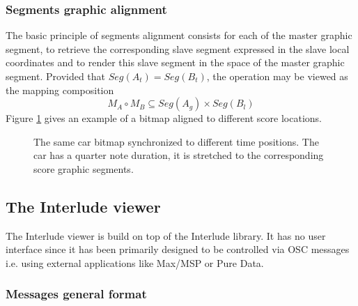 \documentclass[twoside,10pt]{article}
\newcommand{\seg}[1]			{Seg(#1)}
\begin{document}
\subsubsection{Segments graphic alignment}
The basic principle of segments alignment consists for each of the master graphic segment, to retrieve the corresponding slave segment expressed in the slave local coordinates and to render this slave segment in the space of the master graphic segment.
Provided that $\seg{A_t} = \seg{B_t}$, the operation may be viewed as the mapping composition 
\[
M_{A} \circ M_{B} \subseteq \seg{A_{g}}\times \seg{B_{l}}
\]
Figure \ref{fig:align} gives an example of a bitmap aligned to different score locations.
\begin{figure}[htbp]
\centerline{
	}
\caption{The same car bitmap synchronized to different time positions. The car has a quarter note duration, it is stretched to the corresponding score graphic segments.}
\label{fig:align}
\end{figure}

\subsection{The Interlude viewer}

The Interlude viewer is build on top of the Interlude library. It has no user interface since it has been primarily designed to be controlled via OSC messages i.e. using external applications like Max/MSP or Pure Data.

\subsubsection{Messages general format}
\end{document}
